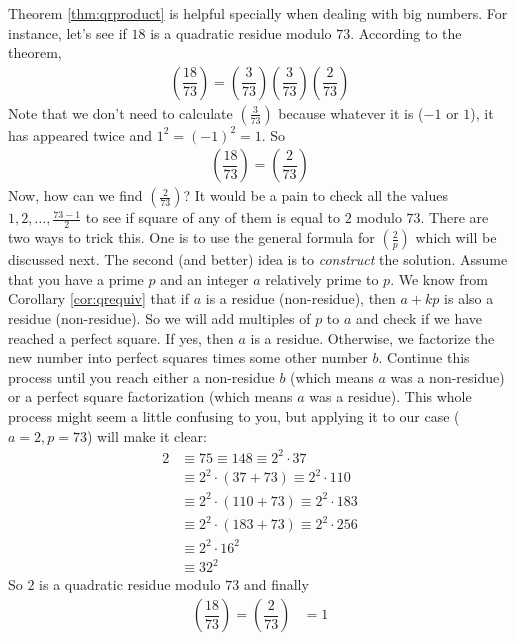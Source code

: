 \documentclass[main.tex]{subfile}
\begin{document}
	\begin{example}
		Theorem \eqref{thm:qrproduct} is helpful specially when dealing with big numbers. For instance, let's see if $18$ is a quadratic residue modulo $73$. According to the theorem,
		\begin{align*}
			\left(\dfrac{18}{73}\right) = \left(\dfrac{3}{73}\right) \left(\dfrac{3}{73}\right) \left(\dfrac{2}{73}\right)
		\end{align*}
		Note that we don't need to calculate $ \left(\frac{3}{73}\right)$ because whatever it is ($-1$ or $1$), it has appeared twice and $1^2=(-1)^2=1$. So
		\begin{align*}
			\left(\dfrac{18}{73}\right) = \left(\dfrac{2}{73}\right)
		\end{align*}
		Now, how can we find $ \left(\frac{2}{73}\right)$? It would be a pain to check all the values $1,2,\ldots, \frac{73-1}{2}$ to see if square of any of them is equal to $2$ modulo $73$. There are two ways to trick this. One is to use the general formula for $ \left(\frac{2}{p}\right)$ which will be discussed next. The second (and better) idea is to \textit{construct} the solution. Assume that you have a prime $p$ and an integer $a$ relatively prime to $p$. We know from Corollary \ref{cor:qrequiv} that if $a$ is a residue (non-residue), then $a+kp$ is also a residue (non-residue). So we will add multiples of $p$ to $a$ and check if we have reached a perfect square. If yes, then $a$ is a residue. Otherwise, we factorize the new number into perfect squares times some other number $b$. Continue this process until you reach either a non-residue $b$ (which means $a$ was a non-residue) or a perfect square factorization (which means $a$ was a residue). This whole process might seem a little confusing to you, but applying it to our case ($a=2, p=73$) will make it clear:
		\begin{align*}
			2 &\equiv 75 \equiv 148\equiv 2^2 \cdot 37\\
			& \equiv 2^2\cdot (37+73) \equiv 2^2 \cdot 110\\
			&\equiv 2^2\cdot (110+73) \equiv 2^2 \cdot 183\\
			&\equiv 2^2\cdot (183+73) \equiv 2^2 \cdot 256\\
			&\equiv 2^2 \cdot 16^2\\
			&\equiv 32^2
		\end{align*}
		So $2$ is a quadratic residue modulo $73$ and finally
		\begin{align*}
			\left(\dfrac{18}{73}\right) = \left(\dfrac{2}{73}\right)
				& =1
		\end{align*}

	\end{example}
\end{document}
